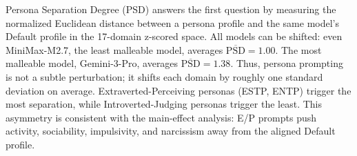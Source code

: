 \documentclass[11pt]{article}
\begin{document}
\begin{table}[t]
\centering
\small
\caption{Persona Separation Degree by model. $\overline{\mathrm{PSD}}$: mean across 16 personas. $\mathrm{PSD}_{\max}$: peak. CV: coefficient of variation.}
\label{tab:psd}
\end{table}

Persona Separation Degree (PSD) answers the first question by measuring the normalized Euclidean distance between a persona profile and the same model's Default profile in the 17-domain z-scored space. All models can be shifted: even MiniMax-M2.7, the least malleable model, averages $\overline{\mathrm{PSD}} = 1.00$. The most malleable model, Gemini-3-Pro, averages $\overline{\mathrm{PSD}} = 1.38$. Thus, persona prompting is not a subtle perturbation; it shifts each domain by roughly one standard deviation on average. Extraverted-Perceiving personas (ESTP, ENTP) trigger the most separation, while Introverted-Judging personas trigger the least. This asymmetry is consistent with the main-effect analysis: E/P prompts push activity, sociability, impulsivity, and narcissism away from the aligned Default profile.
\end{document}
